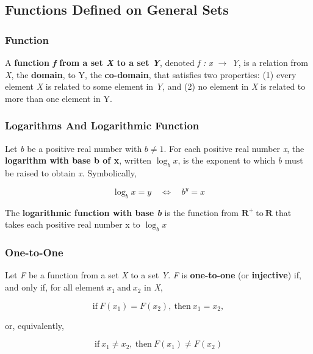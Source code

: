 \documentclass[12pt]{article}
\begin{document}
\subsection{Functions Defined on General Sets}

\subsubsection*{Function}
A \textbf{function \textit{f} from a set \textit{X} to a set \textit{Y}}, denoted \textit{f : x $\rightarrow$ Y}, is a relation from \textit{X}, the \textbf{domain}, to Y, the \textbf{co-domain}, that satisfies two properties: (1) every element \textit{X} is related to some element in \textit{Y}, and (2) no element in \textit{X} is related to more than one element in Y.

\subsubsection*{Logarithms And Logarithmic Function}
Let \textit{b} be a positive real number with \textit{$b \not = 1$}. For each positive real number \textit{x}, the \textbf{logarithm with base b of x}, written $\log_b x$, is the exponent to which \textit{b} must be raised to obtain \textit{x}. Symbolically,

\begin{equation*}
\log_b x = y \quad \Leftrightarrow \quad b^y = x
\end{equation*}

The \textbf{logarithmic function with base \textit{b}} is the function from $\mathbf{R}^+ \ \text{to} \ \mathbf{R}$ that takes each
positive real number x to $\log_b x$

\subsubsection*{One-to-One}
Let \textit{F} be a function from a set \textit{X} to a set \textit{Y}. \textit{F} is \textbf{one-to-one} (or \textbf{injective}) if, and only if, for all element $x_1 \ \text{and} \ x_2$ in \textit{X},

\begin{equation*}
\text{if} \ F(x_1) = F(x_2), \ \text{then} \ x_1 = x_2,
\end{equation*}

or, equivalently,

\begin{equation*}
\text{if} \ x_1 \neq x_2, \ \text{then} \ F(x_1) \neq F(x_2)
\end{equation*}
\end{document}
